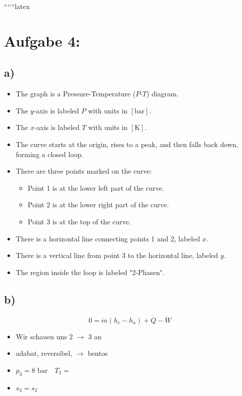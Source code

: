
``````latex


\section*{Aufgabe 4:}

\subsection*{a)}

\begin{itemize}
    \item The graph is a Pressure-Temperature ($P$-$T$) diagram.
    \item The $y$-axis is labeled $P$ with units in $[\text{bar}]$.
    \item The $x$-axis is labeled $T$ with units in $[\text{K}]$.
    \item The curve starts at the origin, rises to a peak, and then falls back down, forming a closed loop.
    \item There are three points marked on the curve:
        \begin{itemize}
            \item Point 1 is at the lower left part of the curve.
            \item Point 2 is at the lower right part of the curve.
            \item Point 3 is at the top of the curve.
        \end{itemize}
    \item There is a horizontal line connecting points 1 and 2, labeled $x$.
    \item There is a vertical line from point 3 to the horizontal line, labeled $y$.
    \item The region inside the loop is labeled "2-Phasen".
\end{itemize}

\subsection*{b)}

\[
0 = \dot{m} (h_e - h_a) + \dot{Q} - \dot{W}
\]

\begin{itemize}
    \item Wir schauen uns 2 $\rightarrow$ 3 an
    \item adabat, reversibel, $\rightarrow$ bentos
    \item $p_3 = 8 \text{ bar} \quad T_3 =$
    \item $s_3 = s_2$
\end{itemize}

